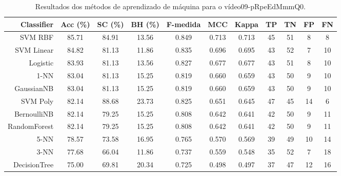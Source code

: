 \begin{table}[!htb]
\centering
\caption{Resultados dos métodos de aprendizado de máquina para o vídeo09-pRpeEdMmmQ0.}
\label{tab:09-pRpeEdMmmQ0}
\begin{tabular}{r|c|c|c|c|c|c|c|c|c|c}
\hline\hline
Classifier & Acc (\%) & SC (\%) & BH (\%) & F-medida & MCC & Kappa & TP & TN & FP & FN \\ \hline
SVM RBF & 85.71 & 84.91 & 13.56 & 0.849 & 0.713 & 0.713 & 45 & 51 & 8 & 8 \\ 
SVM Linear & 84.82 & 81.13 & 11.86 & 0.835 & 0.696 & 0.695 & 43 & 52 & 7 & 10 \\ 
Logistic & 83.93 & 81.13 & 13.56 & 0.827 & 0.677 & 0.677 & 43 & 51 & 8 & 10 \\ 
1-NN & 83.04 & 81.13 & 15.25 & 0.819 & 0.660 & 0.659 & 43 & 50 & 9 & 10 \\ 
GaussianNB & 83.04 & 81.13 & 15.25 & 0.819 & 0.660 & 0.659 & 43 & 50 & 9 & 10 \\ 
SVM Poly & 82.14 & 88.68 & 23.73 & 0.825 & 0.651 & 0.645 & 47 & 45 & 14 & 6 \\ 
BernoulliNB & 82.14 & 79.25 & 15.25 & 0.808 & 0.642 & 0.641 & 42 & 50 & 9 & 11 \\ 
RandomForest & 82.14 & 79.25 & 15.25 & 0.808 & 0.642 & 0.641 & 42 & 50 & 9 & 11 \\ 
5-NN & 78.57 & 73.58 & 16.95 & 0.765 & 0.570 & 0.569 & 39 & 49 & 10 & 14 \\ 
3-NN & 77.68 & 66.04 & 11.86 & 0.737 & 0.559 & 0.548 & 35 & 52 & 7 & 18 \\ 
DecisionTree & 75.00 & 69.81 & 20.34 & 0.725 & 0.498 & 0.497 & 37 & 47 & 12 & 16 \\ 
\hline\hline
\end{tabular}
\end{table}

